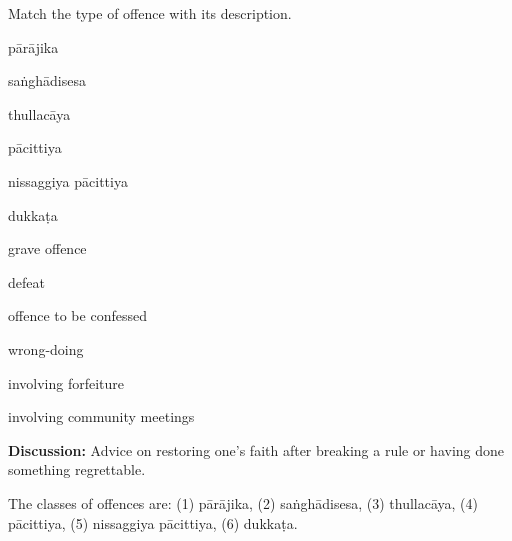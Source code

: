 \begin{exam}{\autoExamName}
\begin{problem}
\end{problem}

\problemDivide

\begin{problem*}

  Match the type of offence with its description.

  \bigskip

  \begin{multicols}{2}

    \begin{parts}

    \item \fillin{2cm}{\ref{parajika}} pārājika
    \item \fillin{2cm}{\ref{sanghadisesa}} saṅghādisesa
    \item \fillin{2cm}{\ref{thullacaya}} thullacāya
    \item \fillin{2cm}{\ref{pacittiya}} pācittiya
    \item \fillin{2cm}{\ref{nissaggiya}} nissaggiya pācittiya
    \item \fillin{2cm}{\ref{dukkata}} dukkaṭa

    \columnbreak

    \bMatchChoices

    \item\label{thullacaya} grave offence
    \item\label{parajika} defeat
    \item\label{pacittiya} offence to be confessed
    \item\label{dukkata} wrong-doing
    \item\label{nissaggiya} involving forfeiture
    \item\label{sanghadisesa} involving community meetings

    \eMatchChoices
      
    \end{parts}
    
  \end{multicols}

  \bigskip

  \textbf{Discussion:} Advice on restoring one's faith after breaking a rule or
  having done something regrettable.

  \begin{solution}
    The classes of offences are: (1) pārājika, (2) saṅghādisesa, (3) thullacāya,
    (4) pācittiya, (5) nissaggiya pācittiya, (6) dukkaṭa.
  \end{solution}


\end{problem*}
\end{exam}
